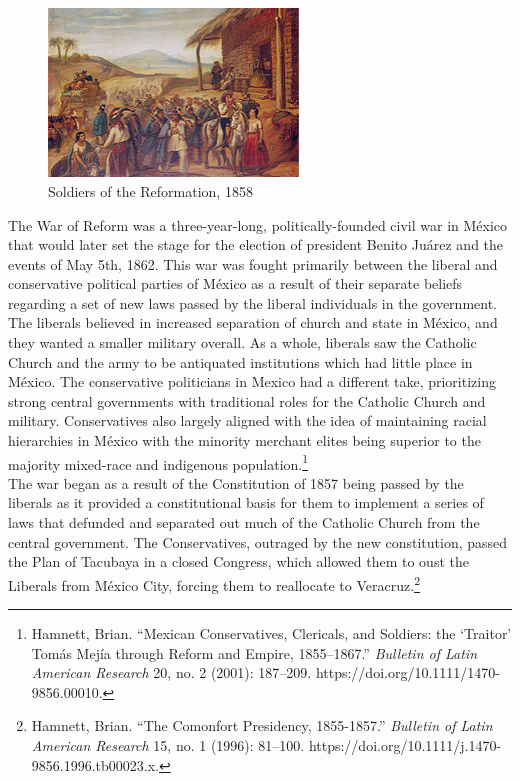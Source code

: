 \documentclass[10pt, letterpaper]{article}
\begin{document}
\begin{figure}
\centering
\includegraphics[width=2.61111in,height=1.76389in]{image8.jpg}
\caption{Soldiers of the Reformation, 1858}
\end{figure}

The War of Reform was a three-year-long, politically-founded civil war
in México that would later set the stage for the election of president
Benito Juárez and the events of May 5th, 1862. This war was fought
primarily between the liberal and conservative political parties of
México as a result of their separate beliefs regarding a set of new laws
passed by the liberal individuals in the government. The liberals
believed in increased separation of church and state in México, and they
wanted a smaller military overall. As a whole, liberals saw the Catholic
Church and the army to be antiquated institutions which had little place
in México. The conservative politicians in Mexico had a different take,
prioritizing strong central governments with traditional roles for the
Catholic Church and military. Conservatives also largely aligned with
the idea of maintaining racial hierarchies in México with the minority
merchant elites being superior to the majority mixed-race and indigenous
population.\footnote{Hamnett, Brian. ``Mexican Conservatives, Clericals,
  and Soldiers: the `Traitor' Tomás Mejía through Reform and Empire,
  1855--1867.'' \emph{Bulletin of Latin American Research} 20, no. 2
  (2001): 187--209. https://doi.org/10.1111/1470-9856.00010.} \\

The war began as a result of the Constitution of 1857 being passed by
the liberals as it provided a constitutional basis for them to implement
a series of laws that defunded and separated out much of the Catholic
Church from the central government. The Conservatives, outraged by the
new constitution, passed the Plan of Tacubaya in a closed Congress,
which allowed them to oust the Liberals from México City, forcing them
to reallocate to Veracruz.\footnote{Hamnett, Brian. ``The Comonfort
  Presidency, 1855-1857.'' \emph{Bulletin of Latin American Research}
  15, no. 1 (1996): 81--100.
  https://doi.org/10.1111/j.1470-9856.1996.tb00023.x.}\\
  
\end{document}
